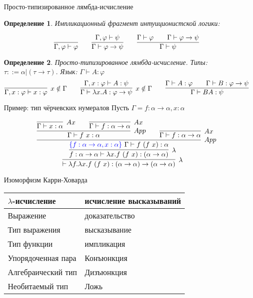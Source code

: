\documentclass[aspectratio=169]{beamer}
\newtheorem{dfn}{Определение}[section]
\begin{document}
\begin{frame}{Просто-типизированное лямбда-исчисление}
\begin{dfn}Импликационный фрагмент интуиционистской логики:

$$\infer{\Gamma,\varphi \vdash \varphi}{} \quad\quad 
  \infer{\Gamma\vdash\varphi\rightarrow\psi}{\Gamma,\varphi\vdash\psi} \quad\quad 
  \infer{\Gamma\vdash\psi}{\Gamma\vdash\varphi\quad\quad\Gamma\vdash\varphi\rightarrow\psi}$$
\end{dfn}

\begin{dfn}
Просто-типизированное лямбда-исчисление. \pause Типы: $\tau ::= \alpha | (\tau\rightarrow\tau)$. \pause Язык: $\Gamma\vdash A:\varphi$
$$\infer[x \notin \Gamma]{\Gamma,x:\varphi \vdash x:\varphi}{} \quad\quad 
  \infer[x \notin \Gamma]{\Gamma\vdash \lambda x.A: \varphi\rightarrow\psi}{\Gamma,x:\varphi\vdash A:\psi} \quad\quad 
  \infer{\Gamma\vdash B A:\psi}{\Gamma\vdash A:\varphi\quad\quad\Gamma\vdash B:\varphi\rightarrow\psi}$$
\end{dfn}
\end{frame}

\begin{frame}{Пример: тип чёрчевских нумералов}
Пусть $\Gamma = f:\alpha\rightarrow\alpha, x: \alpha$

$$\infer[\lambda]{\vdash \lambda f.\lambda x.f\ (f\ x) : (\alpha\rightarrow\alpha)\rightarrow(\alpha\rightarrow\alpha)}{
  \infer[\lambda]{f: \alpha\rightarrow\alpha \vdash \lambda x.f\ (f\ x) : (\alpha\rightarrow\alpha)}{
    \infer[App]{{\color{blue}\{ f:\alpha\rightarrow\alpha, x: \alpha\}\ }\Gamma \vdash f\ (f\ x): \alpha}{
      \infer[App]{\Gamma \vdash f\ x: \alpha}{
        \infer[Ax]{\Gamma \vdash x: \alpha}{}\quad\quad\infer[Ax]{\Gamma \vdash f: \alpha\rightarrow\alpha}{}
      }\quad\quad
      \infer[Ax]{\Gamma \vdash f: \alpha\rightarrow\alpha}{}
    }
  }
}$$
\end{frame}

\begin{frame}{Изоморфизм Карри-Ховарда}

\begin{tabular}{ll}
$\lambda$-исчисление & исчисление высказываний\\\hline
Выражение & доказательство\\
Тип выражения & высказывание\\
Тип функции & импликация\\
Упорядоченная пара & Конъюнкция\\
Алгебраический тип & Дизъюнкция\\
Необитаемый тип & Ложь
\end{tabular}

\end{frame}
\end{document}
